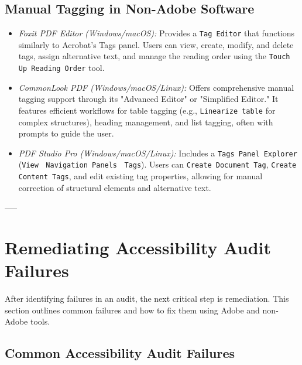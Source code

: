 \subsection{Manual Tagging in Non-Adobe Software}
\label{subsec:manual-tagging-non-adobe}
\begin{itemize}
\item \emph{Foxit PDF Editor (Windows/macOS):} Provides a \texttt{Tag Editor} that functions similarly to Acrobat's Tags panel. Users can view, create, modify, and delete tags, assign alternative text, and manage the reading order using the \texttt{Touch Up Reading Order} tool.
\item \emph{CommonLook PDF (Windows/macOS/Linux):} Offers comprehensive manual tagging support through its "Advanced Editor" or "Simplified Editor." It features efficient workflows for table tagging (e.g., \texttt{Linearize table} for complex structures), heading management, and list tagging, often with prompts to guide the user.
\item \emph{PDF Studio Pro (Windows/macOS/Linux):} Includes a \texttt{Tags Panel Explorer} (\texttt{View} $\>$ \texttt{Navigation Panels} $\>$ \texttt{Tags}). Users can \texttt{Create Document Tag}, \texttt{Create Content Tags}, and edit existing tag properties, allowing for manual correction of structural elements and alternative text.
\end{itemize}

-----

\section{Remediating Accessibility Audit Failures}
\label{sec:remediation}
After identifying failures in an audit, the next critical step is remediation. This section outlines common failures and how to fix them using Adobe and non-Adobe tools.

\subsection{Common Accessibility Audit Failures}
\label{subsec:common-failures}

